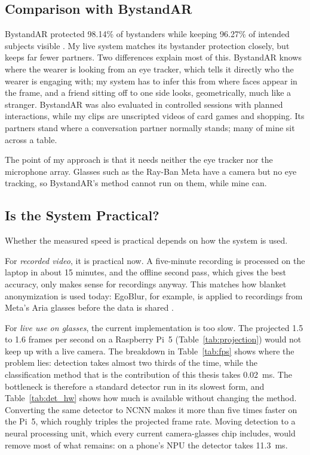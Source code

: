 \subsection{Comparison with BystandAR}
\label{sec:disc_bystandar}

BystandAR protected 98.14\% of bystanders while keeping 96.27\% of intended subjects
visible \cite{bystandar}. My live system matches its bystander protection closely, but
keeps far fewer partners. Two differences explain most of this. BystandAR knows where the
wearer is looking from an eye tracker, which tells it directly who the wearer is engaging
with; my system has to infer this from where faces appear in the frame, and a friend
sitting off to one side looks, geometrically, much like a stranger. BystandAR was also
evaluated in controlled sessions with planned interactions, while my clips are
unscripted videos of card games and shopping. Its partners stand where a conversation
partner normally stands; many of mine sit across a table.

The point of my approach is that it needs neither the eye tracker nor the microphone
array. Glasses such as the Ray-Ban Meta have a camera but no eye tracking, so BystandAR's
method cannot run on them, while mine can.

\subsection{Is the System Practical?}
\label{sec:disc_fps}

Whether the measured speed is practical depends on how the system is used.

For \emph{recorded video}, it is practical now. A five-minute recording is processed on
the laptop in about 15 minutes, and the offline second pass, which gives the best
accuracy, only makes sense for recordings anyway. This matches how blanket anonymization
is used today: EgoBlur, for example, is applied to recordings from Meta's Aria glasses
before the data is shared \cite{egoblur2023}.

For \emph{live use on glasses}, the current implementation is too slow. The projected
1.5 to 1.6 frames per second on a Raspberry Pi~5 (Table~\ref{tab:projection}) would not
keep up with a live camera. The breakdown in Table~\ref{tab:fps} shows where the problem
lies: detection takes almost two thirds of the time, while the classification method that
is the contribution of this thesis takes 0.02~ms. The bottleneck is therefore a standard
detector run in its slowest form, and Table~\ref{tab:det_hw} shows how much is available
without changing the method. Converting the same detector to NCNN makes it more than five
times faster on the Pi~5, which roughly triples the projected frame rate. Moving detection
to a neural processing unit, which every current camera-glasses chip includes, would
remove most of what remains: on a phone's NPU the detector takes 11.3~ms.

